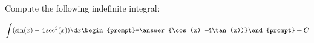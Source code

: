 \documentclass{ximera}
\author{Jim Talamo}
\begin{document}
\begin{exercise}
Compute the following indefinite integral:

\[
\int (\sin(x)-4\sec^2(x) ) \d x 
\begin{prompt}=\answer{\cos(x) -4\tan(x))}\end{prompt}+C
\]
\end{exercise}
\end{document}
